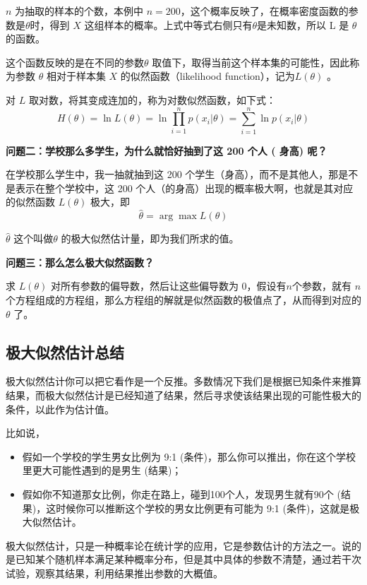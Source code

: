 \documentclass[12pt]{article}
\begin{document}
$n$ 为抽取的样本的个数，本例中 $n=200$，这个概率反映了，在概率密度函数的参数是$\theta$时，得到 $X$ 这组样本的概率。上式中等式右侧只有$\theta$是未知数，所以 L 是 $\theta$ 的函数。

这个函数反映的是在不同的参数$\theta$ 取值下，取得当前这个样本集的可能性，因此称为参数 $\theta$ 相对于样本集 $X$ 的似然函数（likelihood function），记为$L(\theta)$ 。

对 $L$ 取对数，将其变成连加的，称为对数似然函数，如下式：
$$
H(\theta) = \ln L(\theta) = \ln \prod_{i=1}^np(x_i|\theta) = \sum_{i=1}^n\ln p(x_i|\theta)
$$

\textbf{问题二：学校那么多学生，为什么就恰好抽到了这 200 个人 ( 身高) 呢？}

在学校那么学生中，我一抽就抽到这 200 个学生（身高），而不是其他人，那是不是表示在整个学校中，这 200 个人（的身高）出现的概率极大啊，也就是其对应的似然函数 $L(\theta)$ 极大，即
$$
\hat{\theta} = \arg\max L(\theta)
$$

$\hat{\theta} $ 这个叫做$\theta$ 的极大似然估计量，即为我们所求的值。

\textbf{问题三：那么怎么极大似然函数？}

求 $L(\theta)$ 对所有参数的偏导数，然后让这些偏导数为 0，假设有$n$个参数，就有 $n$ 个方程组成的方程组，那么方程组的解就是似然函数的极值点了，从而得到对应的 $\theta$ 了。

\subsection{极大似然估计总结}
极大似然估计你可以把它看作是一个反推。多数情况下我们是根据已知条件来推算结果，而极大似然估计是已经知道了结果，然后寻求使该结果出现的可能性极大的条件，以此作为估计值。

比如说，
\begin{itemize}
\setlength{\itemsep}{0pt}
\setlength{\parsep}{0pt}
\setlength{\parskip}{0pt}
    \item 假如一个学校的学生男女比例为 9:1 (条件)，那么你可以推出，你在这个学校里更大可能性遇到的是男生 (结果)；
    \item 假如你不知道那女比例，你走在路上，碰到100个人，发现男生就有90个 (结果)，这时候你可以推断这个学校的男女比例更有可能为 9:1 (条件)，这就是极大似然估计。
\end{itemize}

极大似然估计，只是一种概率论在统计学的应用，它是参数估计的方法之一。说的是已知某个随机样本满足某种概率分布，但是其中具体的参数不清楚，通过若干次试验，观察其结果，利用结果推出参数的大概值。
\end{document}
